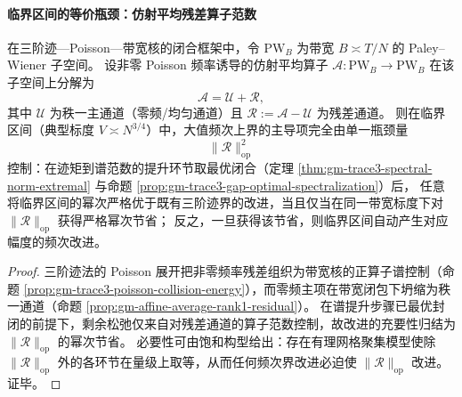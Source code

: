 \paragraph{临界区间的等价瓶颈：仿射平均残差算子范数}
\begin{theorem}\label{thm:gm-critical-bottleneck-residual-opnorm}
在三阶迹—Poisson—带宽核的闭合框架中，令 \(\mathrm{PW}_B\) 为带宽 \(B\asymp T/N\) 的 Paley--Wiener 子空间。
设非零 Poisson 频率诱导的仿射平均算子 \(\mathcal{A}:\mathrm{PW}_B\to\mathrm{PW}_B\) 在该子空间上分解为
\[
\mathcal{A}=\mathcal{U}+\mathcal{R},
\]
其中 \(\mathcal{U}\) 为秩一主通道（零频/均匀通道）且 \(\mathcal{R}:=\mathcal{A}-\mathcal{U}\) 为残差通道。
则在临界区间（典型标度 \(V\asymp N^{3/4}\)）中，大值频次上界的主导项完全由单一瓶颈量
\[
\boxed{\ \|\mathcal{R}\|_{\mathrm{op}}^2\ }
\]
控制：在迹矩到谱范数的提升环节取最优闭合（定理 \ref{thm:gm-trace3-spectral-norm-extremal} 与命题 \ref{prop:gm-trace3-gap-optimal-spectralization}）后，
任意将临界区间的幂次严格优于既有三阶迹界的改进，当且仅当在同一带宽标度下对 \(\|\mathcal{R}\|_{\mathrm{op}}\) 获得严格幂次节省；
反之，一旦获得该节省，则临界区间自动产生对应幅度的频次改进。
\end{theorem}

\begin{proof}
三阶迹法的 Poisson 展开把非零频率残差组织为带宽核的正算子谱控制（命题 \ref{prop:gm-trace3-poisson-collision-energy}），而零频主项在带宽闭包下坍缩为秩一通道（命题 \ref{prop:gm-affine-average-rank1-residual}）。
在谱提升步骤已最优封闭的前提下，剩余松弛仅来自对残差通道的算子范数控制，故改进的充要性归结为 \(\|\mathcal{R}\|_{\mathrm{op}}\) 的幂次节省。
必要性可由饱和构型给出：存在有理网格聚集模型使除 \(\|\mathcal{R}\|_{\mathrm{op}}\) 外的各环节在量级上取等，从而任何频次界改进必迫使 \(\|\mathcal{R}\|_{\mathrm{op}}\) 改进。证毕。
\end{proof}

